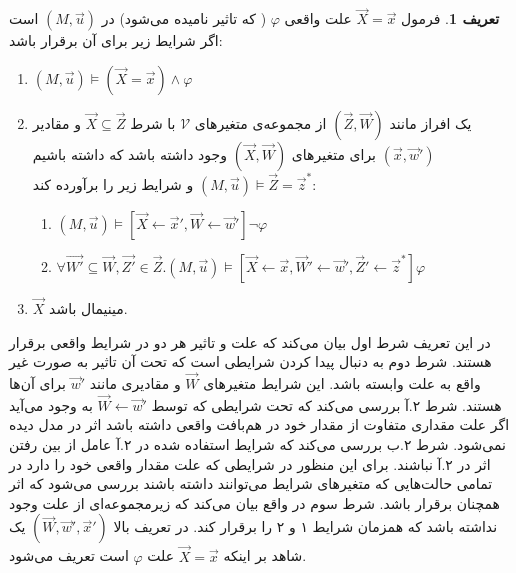 \documentclass[
msc,
irfonts
]{./tex/tehran-thesis}
\newcommand{\پ}{پروژه/پایان‌نامه/رساله }
\theoremstyle{definition}
\newtheorem{definition}{تعریف}[section]
\theoremstyle{theorem}
\theoremstyle{definition}
\numberwithin{algorithm}{chapter}
\newcommand{\la}{\leftarrow}
\newcommand{\mc}[1]{\mathcal{#1}}
\newcommand{\lf}[1]{\LTRfootnote{#1}}
\begin{document}
\begin{definition}
      \label{def:cause}
      فرمول
      $\vec X = \vec x$
      علت واقعی
      $\varphi$
      (
      که تاثیر\lf{Effect}
      نامیده می‌شود)
      در
      $(M,\vec{u})$
      است
      اگر شرایط زیر برای آن برقرار باشد:
      \begin{enumerate}
            \item $(M,\vec{u}) \vDash (\vec{X} = \vec{x}) \wedge \varphi$
            \item یک افراز مانند
                  $(\vec{Z},\vec{W})$
                  از مجموعه‌ی متغیر‌های
                  $\mc{V}$
                  با شرط
                  $\vec{X} \subseteq \vec{Z}$
                  و مقادیر
                  $(\vec{x},\vec{w}')$
                  برای متغیر‌های
                  $(\vec{X},\vec{W})$
                  وجود داشته باشد که داشته باشیم
                  $(M,\vec{u})\vDash \vec{Z} = \vec{z}^*$
                  و شرایط زیر را برآورده کند:
                  \begin{enumerate}
                        \item $(M,\vec u)\vDash[\vec{X}\la\vec{x}',\vec{W}\la\vec{w}']
                                    \neg \varphi$
                        \item $\forall \vec{W'} \subseteq \vec{W},\vec{Z'}\in \vec{Z}.
                                    (M,\vec{u})\vDash [\vec X\la\vec x,\vec{W}'\la \vec{w}',\vec{Z}'\la \vec{z}^*]\varphi$
                  \end{enumerate}
            \item $\vec X$
                  مینیمال باشد.
      \end{enumerate}
\end{definition}
در این تعریف شرط اول بیان می‌کند که علت و تاثیر هر دو در شرایط واقعی برقرار هستند.
شرط دوم به دنبال پیدا کردن شرایطی است که تحت آن تاثیر به صورت غیر واقع به علت وابسته باشد.
این شرایط متغیرهای
$\vec W$
و مقادیری مانند
$\vec{w}'$
برای آن‌ها هستند.
شرط ۲.آ بررسی می‌کند که تحت شرایطی که توسط
$\vec W \la \vec{w}'$
به وجود می‌آید اگر علت مقداری متفاوت از مقدار خود در هم‌بافت واقعی داشته باشد اثر در مدل دیده نمی‌شود.
شرط ۲.ب بررسی می‌کند که شرایط
استفاده شده در ۲.آ عامل
از بین رفتن اثر در ۲.آ نباشند.
برای این منظور در شرایطی که علت مقدار واقعی خود را دارد در تمامی حالت‌هایی که متغیر‌های شرایط می‌توانند داشته باشند بررسی می‌شود که اثر همچنان برقرار باشد.
شرط سوم در واقع بیان می‌کند که زیرمجموعه‌ای از علت وجود نداشته باشد که همزمان شرایط ۱ و ۲ را برقرار کند.
در تعریف بالا
$(\vec W, \vec w',\vec x')$
یک شاهد\lf{Witness}
بر اینکه
$\vec X = \vec x$
علت
$\varphi$
است تعریف می‌شود.
\end{document}
